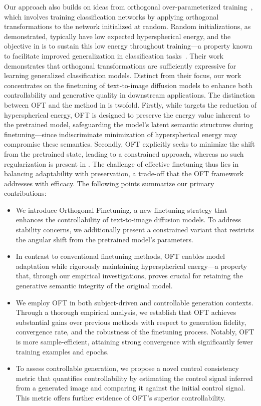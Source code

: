 Our approach also builds on ideas from orthogonal over-parameterized training~\cite{liu2021orthogonal}, which involves training classification networks by applying orthogonal transformations to the network initialized at random. Random initializations, as demonstrated, typically have low expected hyperspherical energy, and the objective in \cite{liu2021orthogonal} is to sustain this low energy throughout training—a property known to facilitate improved generalization in classification tasks~\cite{liu2018learning,lin2020regularizing}. Their work demonstrates that orthogonal transformations are sufficiently expressive for learning generalized classification models. Distinct from their focus, our work concentrates on the finetuning of text-to-image diffusion models to enhance both controllability and generative quality in downstream applications. The distinction between OFT and the method in \cite{liu2021orthogonal} is twofold. Firstly, while \cite{liu2021orthogonal} targets the reduction of hyperspherical energy, OFT is designed to preserve the energy value inherent to the pretrained model, safeguarding the model’s latent semantic structures during finetuning—since indiscriminate minimization of hyperspherical energy may compromise these semantics. Secondly, OFT explicitly seeks to minimize the shift from the pretrained state, leading to a constrained approach, whereas no such regularization is present in \cite{liu2021orthogonal}. The challenge of effective finetuning thus lies in balancing adaptability with preservation, a trade-off that the OFT framework addresses with efficacy. The following points summarize our primary contributions:

\begin{itemize}[leftmargin=*,nosep]

    \item We introduce Orthogonal Finetuning, a new finetuning strategy that enhances the controllability of text-to-image diffusion models. To address stability concerns, we additionally present a constrained variant that restricts the angular shift from the pretrained model's parameters.
    \item In contrast to conventional finetuning methods, OFT enables model adaptation while rigorously maintaining hyperspherical energy—a property that, through our empirical investigations, proves crucial for retaining the generative semantic integrity of the original model.
    \item We employ OFT in both subject-driven and controllable generation contexts. Through a thorough empirical analysis, we establish that OFT achieves substantial gains over previous methods with respect to generation fidelity, convergence rate, and the robustness of the finetuning process. Notably, OFT is more sample-efficient, attaining strong convergence with significantly fewer training examples and epochs.
    \item To assess controllable generation, we propose a novel control consistency metric that quantifies controllability by estimating the control signal inferred from a generated image and comparing it against the initial control signal. This metric offers further evidence of OFT’s superior controllability.
\end{itemize}

